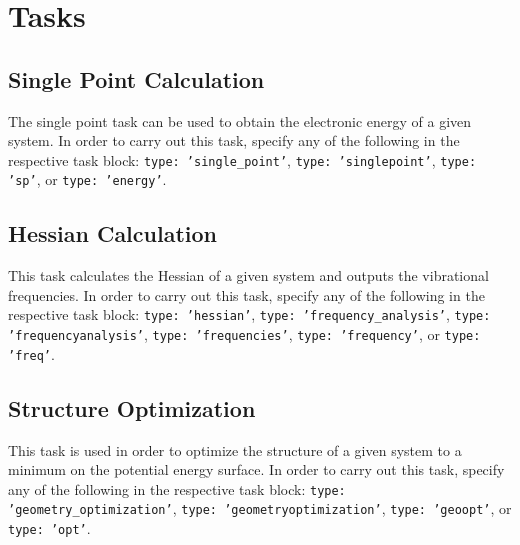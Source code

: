 \documentclass[]{tufte-book}
\begin{document}
\section{Tasks}

\subsection{Single Point Calculation}

The single point task can be used to obtain the electronic energy of a given system. In order to carry out this task,
specify any of the following in the respective task block: \texttt{type: 'single\_point'}, \texttt{type: 'singlepoint'},
\texttt{type: 'sp'}, or \texttt{type: 'energy'}.

\subsection{Hessian Calculation}

This task calculates the Hessian of a given system and outputs the vibrational frequencies. In order to carry out this task,
specify any of the following in the respective task block: \texttt{type: 'hessian'}, \texttt{type: 'frequency\_analysis'},
\texttt{type: 'frequencyanalysis'}, \texttt{type: 'frequencies'}, \texttt{type: 'frequency'}, or \texttt{type: 'freq'}.

\subsection{Structure Optimization}

This task is used in order to optimize the structure of a given system to a minimum on the potential energy surface. In 
order to carry out this task, specify any of the following in the respective task block: \texttt{type: 'geometry\_optimization'}, 
\texttt{type: 'geometryoptimization'}, \texttt{type: 'geoopt'}, or \texttt{type: 'opt'}.
\end{document}
